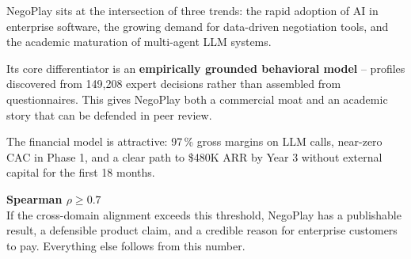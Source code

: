 \documentclass[11pt, a4paper, oneside]{report}
\begin{document}
NegoPlay sits at the intersection of three trends: the rapid adoption of
AI in enterprise software, the growing demand for data-driven negotiation
tools, and the academic maturation of multi-agent LLM systems.

Its core differentiator is an \textbf{empirically grounded behavioral
model} -- profiles discovered from 149{,}208 expert decisions rather than
assembled from questionnaires. This gives NegoPlay both a commercial moat
and an academic story that can be defended in peer review.

The financial model is attractive: 97\,\% gross margins on LLM calls,
near-zero CAC in Phase 1, and a clear path to \$480K ARR by Year 3
without external capital for the first 18 months.

\begin{keybox}
\centering\large
\textbf{Spearman $\rho \geq 0.7$} \\[0.3cm]
\normalsize
If the cross-domain alignment exceeds this threshold, NegoPlay has a
publishable result, a defensible product claim, and a credible reason
for enterprise customers to pay. Everything else follows from this number.
\end{keybox}
\end{document}
